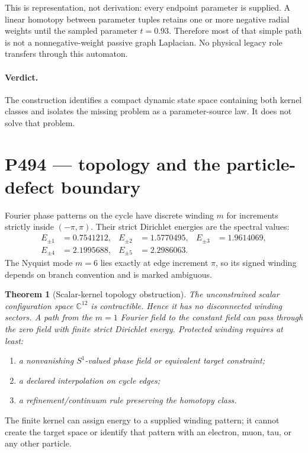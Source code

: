 \documentclass[11pt,a4paper]{article}
\newtheorem{theorem}{Theorem}[section]
\theoremstyle{definition}
\theoremstyle{remark}
\newcommand{\C}{\mathbb C}
\begin{document}
This is representation, not derivation: every endpoint parameter is supplied. A linear homotopy between parameter tuples retains one or more negative radial weights until the sampled parameter $t=0.93$. Therefore most of that simple path is not a nonnegative-weight passive graph Laplacian. No physical legacy role transfers through this automaton.

\paragraph{Verdict.}
The construction identifies a compact dynamic state space containing both kernel classes and isolates the missing problem as a parameter-source law. It does not solve that problem.

\section{P494 --- topology and the particle-defect boundary}

Fourier phase patterns on the cycle have discrete winding $m$ for increments strictly inside $(-\pi,\pi)$. Their strict Dirichlet energies are the spectral values:
\[
\begin{aligned}
E_{\pm1}&=0.7541212,& E_{\pm2}&=1.5770495,& E_{\pm3}&=1.9614069,\\
E_{\pm4}&=2.1995688,& E_{\pm5}&=2.2986063.&&
\end{aligned}
\]
The Nyquist mode $m=6$ lies exactly at edge increment $\pi$, so its signed winding depends on branch convention and is marked ambiguous.

\begin{theorem}[Scalar-kernel topology obstruction]
The unconstrained scalar configuration space $\C^{12}$ is contractible. Hence it has no disconnected winding sectors. A path from the $m=1$ Fourier field to the constant field can pass through the zero field with finite strict Dirichlet energy. Protected winding requires at least:
\begin{enumerate}
\item a nonvanishing $S^1$-valued phase field or equivalent target constraint;
\item a declared interpolation on cycle edges;
\item a refinement/continuum rule preserving the homotopy class.
\end{enumerate}
\end{theorem}

The finite kernel can assign energy to a supplied winding pattern; it cannot create the target space or identify that pattern with an electron, muon, tau, or any other particle.
\end{document}
